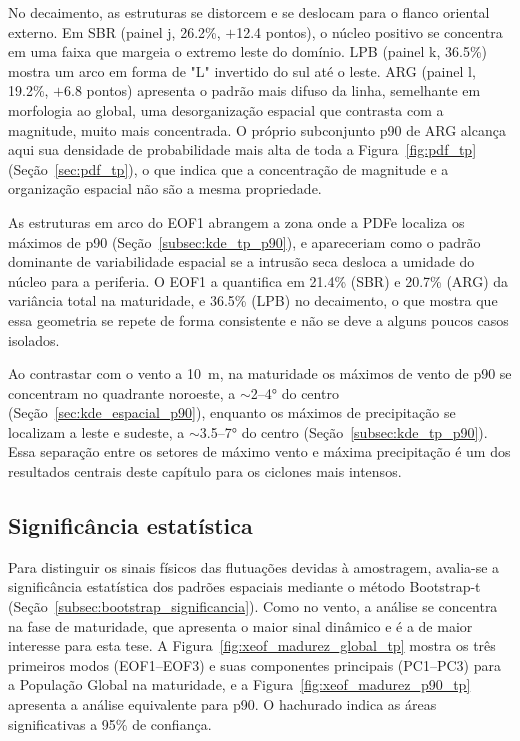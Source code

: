 No decaimento, as estruturas se distorcem e se deslocam para o flanco oriental externo. Em SBR (painel j, 26.2\%, $+$12.4 pontos), o núcleo positivo se concentra em uma faixa que margeia o extremo leste do domínio. LPB (painel k, 36.5\%) mostra um arco em forma de "L" invertido do sul até o leste. ARG (painel l, 19.2\%, $+$6.8 pontos) apresenta o padrão mais difuso da linha, semelhante em morfologia ao global, uma desorganização espacial que contrasta com a magnitude, muito mais concentrada. O próprio subconjunto p90 de ARG alcança aqui sua densidade de probabilidade mais alta de toda a Figura~\ref{fig:pdf_tp} (Seção~\ref{sec:pdf_tp}), o que indica que a concentração de magnitude e a organização espacial não são a mesma propriedade.

As estruturas em arco do EOF1 abrangem a zona onde a PDFe localiza os máximos de p90 (Seção~\ref{subsec:kde_tp_p90}), e apareceriam como o padrão dominante de variabilidade espacial se a intrusão seca desloca a umidade do núcleo para a periferia. O EOF1 a quantifica em 21.4\% (SBR) e 20.7\% (ARG) da variância total na maturidade, e 36.5\% (LPB) no decaimento, o que mostra que essa geometria se repete de forma consistente e não se deve a alguns poucos casos isolados.

Ao contrastar com o vento a 10~m, na maturidade os máximos de vento de p90 se concentram no quadrante noroeste, a ${\sim}$2--4° do centro (Seção~\ref{sec:kde_espacial_p90}), enquanto os máximos de precipitação se localizam a leste e sudeste, a ${\sim}$3.5--7° do centro (Seção~\ref{subsec:kde_tp_p90}). Essa separação entre os setores de máximo vento e máxima precipitação é um dos resultados centrais deste capítulo para os ciclones mais intensos.

\subsection{Significância estatística}\label{subsec:significancia_tp}

Para distinguir os sinais físicos das flutuações devidas à amostragem, avalia-se a significância estatística dos padrões espaciais mediante o método Bootstrap-t (Seção~\ref{subsec:bootstrap_significancia}). Como no vento, a análise se concentra na fase de maturidade, que apresenta o maior sinal dinâmico e é a de maior interesse para esta tese. A Figura~\ref{fig:xeof_madurez_global_tp} mostra os três primeiros modos (EOF1--EOF3) e suas componentes principais (PC1--PC3) para a População Global na maturidade, e a Figura~\ref{fig:xeof_madurez_p90_tp} apresenta a análise equivalente para p90. O hachurado indica as áreas significativas a 95\% de confiança.

